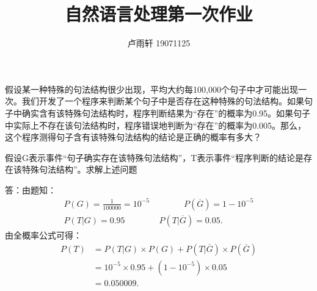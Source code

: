 \documentclass{ctexart}
\title{自然语言处理第一次作业}
\author{卢雨轩 19071125}
\begin{document}
\maketitle

假设某一种特殊的句法结构很少出现，平均大约每100,000个句子中才可能出现一次。我们开发了一个程序来判断某个句子中是否存在这种特殊的句法结构。如果句子中确实含有该特殊句法结构时，程序判断结果为“存在”的概率为0.95。如果句子中实际上不存在该句法结构时，程序错误地判断为“存在”的概率为0.005。那么，这个程序测得句子含有该特殊句法结构的结论是正确的概率有多大？

假设G表示事件“句子确实存在该特殊句法结构”，T表示事件“程序判断的结论是存在该特殊句法结构”。求解上述问题

答：由题知：
\begin{gather}
    P(G) = \frac{1}{100000} = 10^{ - 5} \qquad\qquad P(\overline{G}) = 1 - 10^{ - 5}\\
    P(T | G) = 0.95\qquad\qquad P(T|\overline{G}) = 0.05 .
\end{gather}
由全概率公式可得：
\begin{align}
    P(T) &= P(T|G) \times P(G) + P(T|\overline{G}) \times P(\overline{G}) \\
         &= 10^{ - 5} \times 0.95 + (1 - 10^{ - 5}) \times 0.05 \\
         &= 0.050009 .
\end{align}
\end{document}
